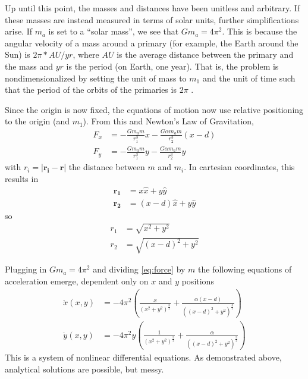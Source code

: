 \documentclass[preprint,titlepage,preprintnumbers,amsmath,amssymb,aps,11pt]{revtex4-2}
\begin{document}
Up until this point, the masses and distances have been unitless and arbitrary. If these masses are instead measured in terms of solar units, further simplifications arise. If $m_a$ is set to a “solar mass”, we see that $Gm_a=4\pi^2$. This is because the angular velocity of a mass around a primary (for example, the Earth around the Sun) is $2\pi*AU/yr$, where $AU$ is the average distance between the primary and the mass and $yr$ is the period (on Earth, one year). That is, the problem is nondimensionalized by setting the unit of mass to $m_1$ and the unit of time such that the period of the orbits of the primaries is $2\pi$ \cite{Wild1980,Worthington2012}.

Since the origin is now fixed, the equations of motion now use relative positioning to the origin (and $m_1$). From this and Newton's Law of Gravitation,
\begin{equation}
    \begin{aligned}
        F_x & =-\frac{Gm_a m}{r_1^3}x-\frac{G\alpha m_a m}{r_2^3}(x-d) \\
        F_y & =-\frac{Gm_a m}{r_1^3}y-\frac{G\alpha m_a m}{r_2^3}y
    \end{aligned}
    \label{eq:force}
\end{equation}
with $r_i=|\bm{r_i}-\bm{r}|$ the distance between $m$ and $m_i$. In cartesian coordinates, this results in
\begin{equation}
    \begin{aligned}
        \bm{r_1} & =x\hat{x}+y\hat{y}     \\
        \bm{r_2} & =(x-d)\hat{x}+y\hat{y}
    \end{aligned}
\end{equation}
so
\begin{equation}
    \begin{aligned}
        r_1 & =\sqrt{x^2+y^2}     \\
        r_2 & =\sqrt{(x-d)^2+y^2}
    \end{aligned}
\end{equation}

Plugging in $Gm_a=4\pi^2$ and dividing \ref{eq:force} by $m$ the following equations of acceleration emerge, dependent only on $x$ and $y$ positions
\begin{equation}
    \begin{aligned}
        \ddot{x}(x,y) & = -4\pi^2(\frac{x}{(x^2+y^2)^{\frac{3}{2}}}+\frac{\alpha(x-d)}{((x-d)^2+y^2)^{\frac{3}{2}}}) \\
        \ddot{y}(x,y) & = -4\pi^2y(\frac{1}{(x^2+y^2)^{\frac{3}{2}}}+\frac{\alpha}{((x-d)^2+y^2)^{\frac{3}{2}}})
    \end{aligned}
\end{equation}
This is a system of nonlinear differential equations. As demonstrated above, analytical solutions are possible, but messy.
\end{document}
